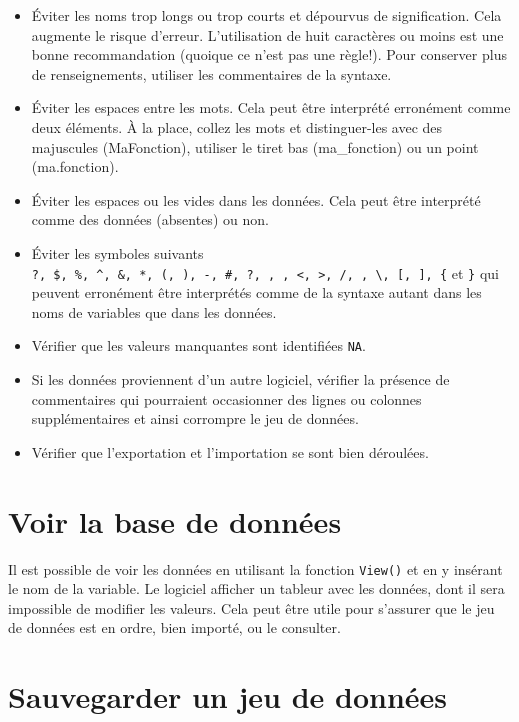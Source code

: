 \documentclass[
]{book}
\begin{document}
\begin{itemize}
\item
  Éviter les noms trop longs ou trop courts et dépourvus de signification. Cela augmente le risque d'erreur. L'utilisation de huit caractères ou moins est une bonne recommandation (quoique ce n'est pas une règle!). Pour conserver plus de renseignements, utiliser les commentaires de la syntaxe.
\item
  Éviter les espaces entre les mots. Cela peut être interprété erronément comme deux éléments. À la place, collez les mots et distinguer-les avec des majuscules (MaFonction), utiliser le tiret bas (ma\_fonction) ou un point (ma.fonction).
\item
  Éviter les espaces ou les vides dans les données. Cela peut être interprété comme des données (absentes) ou non.
\item
  Éviter les symboles suivants \texttt{?,\ \$,\ \%,\ \^{},\ \&,\ *,\ (,\ ),\ -,\ \#,\ ?,\ ,\ ,\ \textless{},\ \textgreater{},\ /,\ \textbar{},\ \textbackslash{},\ {[},\ {]},\ \{} et \texttt{\}} qui peuvent erronément être interprétés comme de la syntaxe autant dans les noms de variables que dans les données.
\item
  Vérifier que les valeurs manquantes sont identifiées \texttt{NA}.
\item
  Si les données proviennent d'un autre logiciel, vérifier la présence de commentaires qui pourraient occasionner des lignes ou colonnes supplémentaires et ainsi corrompre le jeu de données.
\item
  Vérifier que l'exportation et l'importation se sont bien déroulées.
\end{itemize}

\hypertarget{voir-la-base-de-donnuxe9es}{%
\section{Voir la base de données}\label{voir-la-base-de-donnuxe9es}}

Il est possible de voir les données en utilisant la fonction \texttt{View()} et en y insérant le nom de la variable. Le logiciel afficher un tableur avec les données, dont il sera impossible de modifier les valeurs. Cela peut être utile pour s'assurer que le jeu de données est en ordre, bien importé, ou le consulter.

\hypertarget{sauvegarder-un-jeu-de-donnuxe9es}{%
\section{Sauvegarder un jeu de données}\label{sauvegarder-un-jeu-de-donnuxe9es}}
\end{document}
